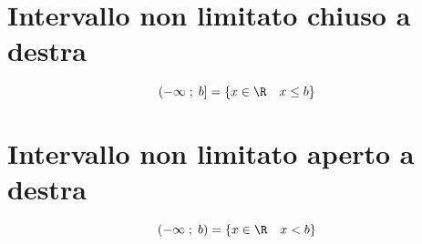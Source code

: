 \section{Intervallo non limitato chiuso a destra}
\begin{equation}
\left(-\infty\; ;\; b\right]=\lbrace x\in\R\quad x\leq b\rbrace
\end{equation}
\section{Intervallo non limitato aperto a destra}
\begin{equation}
\left(-\infty\; ;\; b\right)=\lbrace x\in\R\quad x< b\rbrace
\end{equation}